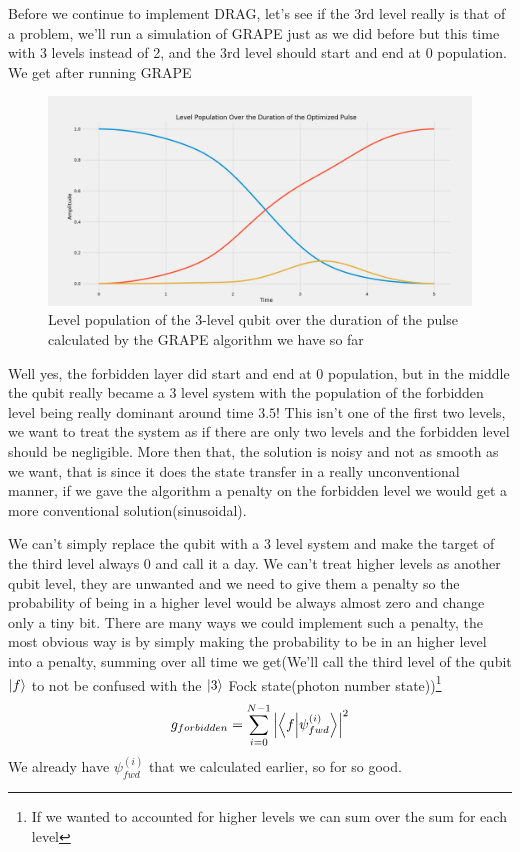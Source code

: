 \documentclass[english, a4paper, 12pt, twoside]{article}
\numberwithin{equation}{section} %
\begin{document}
Before we continue to implement DRAG, let's see if the 3rd level really is that of a problem, we'll run a simulation of GRAPE just as we did before but this time with 3 levels instead of 2, and the 3rd level should start and end at 0 population. We get after running GRAPE
\begin{figure}[H]
    \centering
    \includegraphics[width=1\columnwidth]{Results/Before-Drag/level-population-pretty.png}
    \caption{Level population of the 3-level qubit over the duration of the pulse calculated by the GRAPE algorithm we have so far}
    \label{fig:before-DRAG} %
\end{figure}
Well yes, the forbidden layer did start and end at $0$ population, but in the middle the qubit really became a 3 level system with the population of the forbidden level being really dominant around time $3.5$! This isn't one of the first two levels, we want to treat the system as if there are only two levels and the forbidden level should be negligible. More then that, the solution is noisy and not as smooth as we want, that is since it does the state transfer in a really unconventional manner, if we gave the algorithm a penalty on the forbidden level we would get a more conventional solution(sinusoidal).

We can't simply replace the qubit with a 3 level system and make the target of the third level always 0 and call it a day. We can't treat higher levels as another qubit level, they are unwanted and we need to give them a penalty so the probability of being in a higher level would be always almost zero and change only a tiny bit. There are many ways we could implement such a penalty, the most obvious way is by simply making the probability to be in an higher level into a penalty, summing over all time we get(We'll call the third level of the qubit \(\ket{f}\) to not be confused with the \(\ket{3}\) Fock state(photon number state))\footnote{If we wanted to accounted for higher levels we can sum over the sum for each level}  %
\[
    g_{forbidden} = \sum_{i=0}^{N - 1} \abs{\braket{f}{\psi_{fwd}^{(i)}}}^2 
\]
We already have \(\psi_{fwd}^{(i)}\) that we calculated earlier, so for so good.
\end{document}
